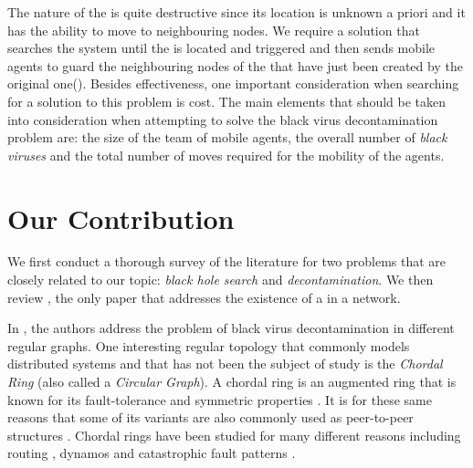 The nature of the \bv  is quite destructive since its location  is unknown a priori and it has the ability to move to neighbouring nodes. We require a solution that searches the system until the \bv is located and triggered and then sends mobile agents to guard the neighbouring nodes of the \bvs that have just been created by the original one(\cite{caietal18}).  Besides effectiveness, one important consideration when searching for a solution to this problem is cost. The main elements that should be taken into consideration when attempting to solve the black virus decontamination problem are:  the size of the team of mobile agents, the overall number of {\it black viruses} and the total number of moves required for the mobility of the agents.




\section{Our Contribution} 


We first conduct a thorough survey of the literature for two problems that are closely related to our topic:  {\it   black hole search} and {\it decontamination}. We then review \cite{caietal18}, the only paper that addresses the existence of a \bv in a network.

In \cite{caietal18}, the authors  address the problem of black virus decontamination in different regular graphs. One interesting regular topology that commonly models distributed systems and that has not been the subject of study is the  {\em Chordal Ring} (also called a {\em Circular Graph}). A chordal ring is an augmented ring that is known for its fault-tolerance \cite{manetal5,baretal9} and symmetric properties \cite{baretal8}. It is for these same reasons that some of its variants are also commonly used as  peer-to-peer structures  \cite{floetal17, floetal30, stoetal10}. Chordal rings have been studied for many different reasons including routing  \cite{manetal6,caietal7}, dynamos  \cite{floetal31} and catastrophic fault patterns \cite{nayetal2,nayetal3}.






